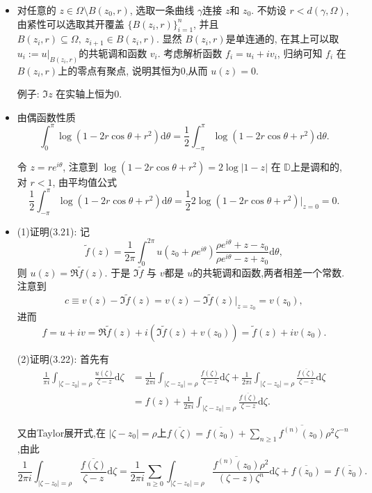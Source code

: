  \begin{itemize}
    \item[3.2.1]

 对任意的 $z \in \Omega\setminus B(z_0,r)$, 选取一条曲线 $\gamma$连接 $z$和 $z_0$. 
 不妨设 $r<d(\gamma,\Omega)$, 由紧性可以选取其开覆盖 $\{B(z_i,r)\}_{i=1}^{n}$, 
 并且 $B(z_i,r)\subseteq \Omega,\ z_{i+1}\in B(z_i,r)$.
 显然 $B(z_i,r)$是单连通的, 在其上可以取 $u_i:=u|_{B(z_i,r)}$的共轭调和函数 $v_i$. 
 考虑解析函数 $f_i = u_i+iv_i$, 归纳可知 $f_i$ 在$B(z_i,r)$上的零点有聚点,
 说明其恒为$0$,从而 $u(z)=0$.

 例子: $\Im z$ 在实轴上恒为$0$.

    \item[3.2.2]

由偶函数性质
 $$\int_0^\pi \log(1-2r\cos\theta+r^2)\mathrm{d}\theta 
 = \frac{1}{2}\int_{-\pi}^\pi \log(1-2r\cos\theta+r^2)\mathrm{d}\theta.$$

令 $z = re^{i\theta}$, 注意到 $\log(1-2r\cos\theta+r^2) = 2\log|1-z|$
在 $\mathbb{D}$上是调和的,对 $r<1$, 由平均值公式
$$\frac{1}{2}\int_{-\pi}^\pi \log(1-2r\cos\theta+r^2)\mathrm{d}\theta 
=\frac{1}{2} 2\log(1-2r\cos\theta+r^2)|_{z=0} = 0.$$


    \item[3.2.3]

 (1)证明(3.21): 记 $$\tilde{f}(z) 
 = \frac{1}{2\pi}\int_0^{2\pi}u(z_0+\rho e^{i\theta})
 \frac{\rho e^{i\theta}+z-z_0}{\rho e^{i\theta}-z+z_0}\mathrm{d}\theta,$$
 则 $u(z) = \Re\tilde{f}(z)$. 
 于是 $\Im\tilde{f}$ 与 $v$都是 $u$的共轭调和函数,两者相差一个常数. 注意到  
 $$c\equiv v(z)-\Im\tilde{f}(z) 
 =  v(z)-\Im \tilde{f}(z) |_{z = z_0} = v(z_0),$$
 进而
 $$f = u+iv = \Re\tilde{f}(z) 
 + i(\Im\tilde{f}(z) + v(z_0)) = \tilde{f}(z)+ iv(z_0).$$

 (2)证明(3.22): 首先有
 \begin{align*} \frac{1}{\pi i}\int_{|\zeta-z_0|=\rho}\frac{u(\zeta)}{\zeta-z}\mathrm{d}\zeta 
 &= \frac{1}{2\pi i}\int_{|\zeta-z_0|=\rho}\frac{f(\zeta)}{\zeta-z}\mathrm{d}\zeta 
 +\frac{1}{2\pi i}\int_{|\zeta-z_0|=\rho}\frac{\overline{f(\zeta)}}{\zeta-z}\mathrm{d}\zeta \\
 &= f(z) +\frac{1}{2\pi i}\int_{|\zeta-z_0|=\rho}\frac{\overline{f(\zeta)}}{\zeta-z}\mathrm{d}\zeta.\end{align*}

又由Taylor展开式,在 $|\zeta-z_0| = \rho$上$\overline{f(\zeta)} 
=\overline{f(z_0)}+\sum_{n\ge 1}\overline{f^{(n)}(z_0)}\rho^2\zeta^{-n}$,由此
 $$\frac{1}{2\pi i}\int_{|\zeta-z_0|=\rho}
 \frac{\overline{f(\zeta)}}{\zeta-z}\mathrm{d}\zeta 
 = \frac{1}{2\pi i} \sum_{n\ge 0}\int_{|\zeta-z_0|=\rho}
 \frac{\overline{f^{(n)}(z_0)}\rho^2}{(\zeta-z)\zeta^n}\mathrm{d}\zeta 
 + \overline{f(z_0)} = \overline{f(z_0)}.$$


\end{itemize}
